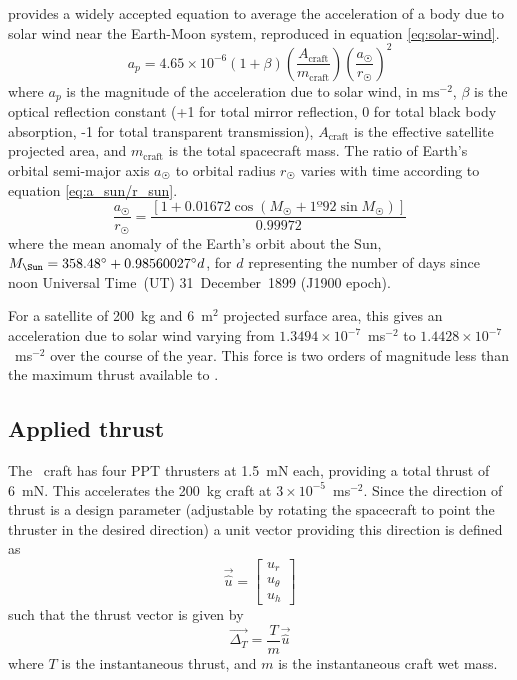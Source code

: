 \textcite[p. 223]{Chobotov2002} provides a widely accepted equation to average the acceleration
 of a body due to solar wind near the Earth-Moon system, reproduced in equation \eqref{eq:solar-wind}.
\begin{equation}\label{eq:solar-wind}
a_{p}=4.65\times10^{-6}(1+\beta)\left(\frac{A_{\text{craft}}}{m_{\text{craft}}}\right)\left(\frac{a_\Sun}{r_\Sun}\right)^{2}
\end{equation}
where $a_{p}$ is the magnitude of the acceleration due to solar wind, in $\text{ms}^{-2}$, $\beta$ is the optical reflection constant (+1 for total mirror reflection, 0 for total black body absorption, -1 for total transparent transmission), $A_{\text{craft}}$ is the effective satellite projected area, and $m_{\text{craft}}$ is the total spacecraft mass. The ratio of Earth's orbital semi-major axis $a_\Sun$ to orbital radius $r_\Sun$ varies with time according to equation \eqref{eq:a_sun/r_sun}.
\begin{equation}\label{eq:a_sun/r_sun}
\frac{a_\Sun}{r_\Sun}=\frac{[1+0.01672\cos(M_\Sun+1º92\sin M_\Sun)]}{0.99972}
\end{equation}
where the mean anomaly of the Earth's orbit about the Sun, $M_\Sun=358.48\degrees+0.98560027\degrees d$, for $d$ representing the number of days since noon Universal Time~(UT) 31~December~1899 (J1900 epoch).

For a satellite of 200~kg and 6~m$^2$ projected surface area, this gives an acceleration due to solar wind varying from $1.3494\times10^{-7}$~ms$^{-2}$ to $1.4428\times10^{-7}$~ms$^{-2}$ over the course of the year. This force is two orders of magnitude less than the maximum thrust available to \BW.




\subsection{Applied thrust} \label{sub:Applied-Thrust}

The \BW\ craft has four PPT thrusters at 1.5~mN each, providing a total thrust of 6~mN. This accelerates the 200~kg craft at $3\times10^{-5}$~ms$^{-2}$. Since the direction of thrust is a design parameter (adjustable by rotating the spacecraft to point the thruster in the desired direction) a unit vector providing this direction is defined as
\begin{equation} \label{eq:thrust-vector}
\vec{\hat{u}}=\left[\begin{array}{c}
u_{r}\\
u_{\theta}\\
u_{h}
\end{array}\right]
\end{equation}
such that the thrust vector is given by 
\begin{equation}
\vec{\Delta_{T}}=\frac{T}{m}\vec{\hat{u}} \label{eq:thrust-perturbation}
\end{equation}
where $T$ is the instantaneous thrust, and $m$ is the instantaneous craft wet mass.

